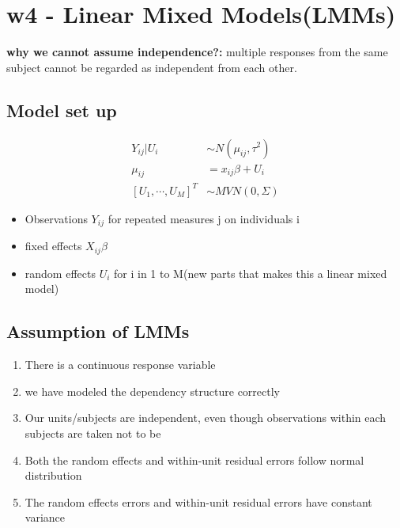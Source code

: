 \documentclass{article}
\theoremstyle{definition}
\theoremstyle{thrm}
\theoremstyle{lma}
\theoremstyle{ppst}
\theoremstyle{crlr}
\begin{document}
\section{w4 - Linear Mixed Models(LMMs)}
\textbf{why we cannot assume independence?: }multiple responses from the same subject cannot be regarded as independent from each other.

\subsection{Model set up}
\begin{align*}
	Y_{ij}|U_i &\sim N(\mu_{ij},\tau^2)\\
	\mu_{ij} &= x_{ij}\beta+U_i\\
	[U_1,\cdots,U_M]^T&\sim MVN(0,\Sigma)
\end{align*}
\begin{itemize}
	\item Observations $Y_{ij}$ for repeated measures j on individuals i
	\item fixed effects $X_{ij}\beta$
	\item random effects $U_i$ for i in 1 to M(new parts that makes this a linear mixed model)
\end{itemize}

\subsection{Assumption of LMMs}
\begin{enumerate}
	\item There is a continuous response variable
	\item we have modeled the dependency structure correctly
	\item Our units/subjects are independent, even though observations within each subjects are taken not to be
	\item Both the random effects and within-unit residual errors follow normal distribution
	\item The random effects errors and within-unit residual errors have constant variance
\end{enumerate}
\end{document}

